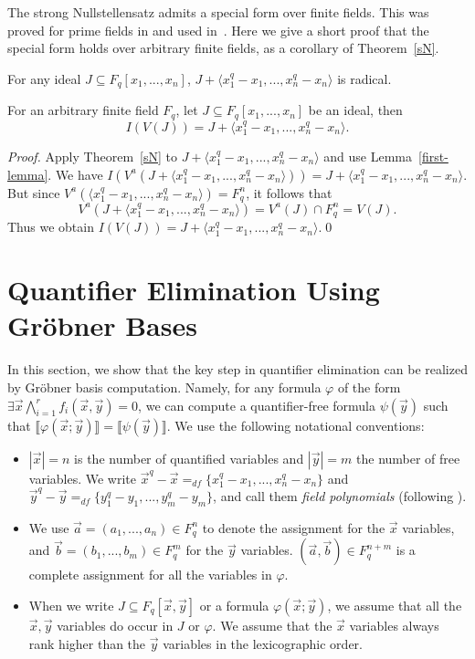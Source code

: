 \documentclass[envcountsect]{llncs}
\begin{document}
The strong Nullstellensatz admits a special form over finite fields. This was proved for prime fields in \cite{germ} and used in~\cite{poly,Marchand98onthe}. Here we give a short proof that the special form holds over arbitrary finite fields, as a corollary of Theorem~\ref{sN}.

\begin{lemma}\label{first-lemma}
For any ideal $J\subseteq F_q[x_1,...,x_n]$, $J+ \langle
x_1^q-x_1,...,x_n^q-x_n\rangle$ is radical.
\end{lemma}

\begin{theorem}
\label{null}
For an arbitrary finite field $F_q$, let $J\subseteq F_q[x_1,...,x_n]$ be an ideal,
then $$I(V(J))=J+\langle x_1^q-x_1,...,x_n^q-x_n\rangle.$$
\end{theorem}
\begin{proof}
Apply Theorem~\ref{sN} to $J+\langle x_1^q-x_1,...,x_n^q-x_n\rangle$ and use Lemma~\ref{first-lemma}. We have 
$I(V^a(J+\langle x_1^q-x_1,...,x_n^q-x_n\rangle))= J+\langle x_1^q-x_1,...,x_n^q-x_n\rangle
$.
But since $V^a(\langle x_1^q-x_1,...,x_n^q-x_n\rangle)=F_q^n$, it follows that $$V^a(J+\langle
x_1^q-x_1,...,x_n^q-x_n\rangle)=V^a(J)\cap F_q^n = V(J).$$ Thus we obtain $I(V(J))=J+\langle x_1^q-x_1,...,x_n^q-x_n\rangle.$\qed
\end{proof}



\section{Quantifier Elimination Using Gr\"obner Bases}

In this section, we show that the key step in quantifier elimination can be realized by Gr\"obner basis computation. Namely, for any formula $\varphi$ of the form $\exists \vec x \bigwedge_{i=1}^r f_i (\vec x, \vec y) =0$, we can compute a quantifier-free formula $\psi(\vec y)$ such that $\llbracket \varphi(\vec x;\vec y) \rrbracket = \llbracket \psi(\vec y) \rrbracket$. We use the following notational conventions:
\begin{itemize}
\item $|\vec x|=n$ is the number of quantified variables and $|\vec y|=m$ the number of free variables. We write $\vec x^q-\vec x =_{df} \{x_1^q-x_1,...,x_n^q-x_n\}$ and $\vec y^q-\vec y =_{df} \{y_1^q-y_1,...,y_m^q-y_m\}$, and call them {\em field polynomials} (following \cite{germ}).

\item We use $\vec a = (a_1,...,a_n)\in F_q^n$ to denote the assignment for the $\vec x$ variables, and $\vec b=(b_1,...,b_m) \in F_q^m$ for the $\vec y$ variables. $(\vec a,\vec b)\in F_q^{n+m}$ is a complete assignment for all the variables in $\varphi$.

\item When we write $J\subseteq F_q[\vec x, \vec y]$ or a formula $\varphi(\vec x; \vec y)$, we assume that all the $\vec x, \vec y$ variables do occur in $J$ or $\varphi$. We assume that the $\vec x$ variables always rank higher than the $\vec y$ variables in the lexicographic order. 
\end{itemize}
\end{document}
